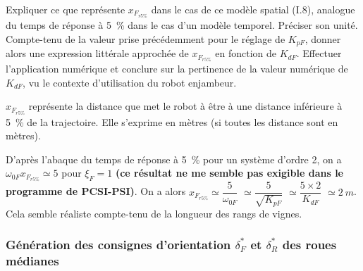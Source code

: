 \documentclass[11pt]{article}
\begin{document}
\UPSTIquestion Expliquer ce que représente $x_{F_{r5\%}}$ dans le cas de ce modèle spatial (I.8), analogue du temps de réponse à \SI{5}{\%} dans le cas d’un modèle temporel. Préciser son unité. Compte-tenu de la valeur prise précédemment pour le réglage de $K_{pF}$, donner alors une expression littérale approchée de  $x_{F_{r5\%}}$ en fonction de $K_{dF}$. Effectuer
l’application numérique et conclure sur la pertinence de la valeur numérique de $K_{dF}$, vu le contexte d’utilisation
du robot enjambeur.

\begin{UPSTIcorrige}
$x_{F_{r5\%}}$ représente la distance que met le robot à être à une distance inférieure à \SI{5}{\%} de la trajectoire. Elle s'exprime en mètres (si toutes les distance sont en mètres).

D'après l'abaque du temps de réponse à \SI{5}{\%} pour un système d'ordre 2, on a  $\omega_{0F} x_{F_{r5\%}}\simeq 5$ pour $\xi_F=1$  \textbf{(ce résultat ne me semble pas exigible dans le programme de PCSI-PSI)}. On a alors 
$x_{F_{r5\%}} \simeq \dfrac{5}{\omega_{0F} }$ $\simeq\dfrac{5}{\sqrt{K_{pF}}}$ $\simeq \dfrac{5\times 2}{K_{dF}}$ $\simeq \SI{2}{m}$.
Cela semble réaliste compte-tenu de la longueur des rangs de vignes.
\end{UPSTIcorrige}

\subsubsection{Génération des consignes d'orientation $\delta_F^*$ et $\delta_R^*$ des roues médianes}
\end{document}
